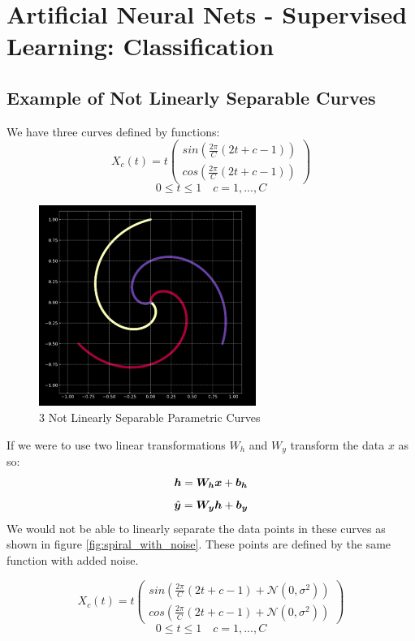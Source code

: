 \chapter{Artificial Neural Nets - Supervised Learning: Classification }

\section{Example of Not Linearly Separable Curves}

We have three curves defined by functions:
\[X_c(t) = t
\begin{pmatrix}
    sin( \frac{2 \pi}{C}(2t + c -1)) \\
    cos( \frac{2 \pi}{C}(2t + c -1))
\end{pmatrix}
 \]
\[ 0 \leq t \leq 1 \quad c = 1,..., C\]

\begin{figure}[ht]
    \centering
    \includegraphics[width=200pt]{labs/02/images/spiral1.png}
    \caption{3 Not Linearly Separable Parametric Curves}
    \label{fig:spiral}
\end{figure}
 
\newpage

If we were to use two linear transformations $ W_h$ and $ W_y$  transform the data $x$ as so:
\[\bm{h}= \bm{W_h}\bm{x}+ \bm{b_h} \]
\[\hat{\bm{y}} = \bm{W_y} \bm{h} + \bm{b_y}\]
We would not be able to  linearly separate the data points in these curves as shown in figure \ref{fig:spiral_with_noise}.  These points are defined by the same function with added noise.

\[X_c(t) = t
\begin{pmatrix}
    sin( \frac{2 \pi}{C}(2t + c -1) + \mathcal{N} (0, \sigma ^2 )) \\
    cos( \frac{2 \pi}{C}(2t + c -1) + \mathcal{N} (0, \sigma ^2 ) )
\end{pmatrix}
 \]
\[ 0 \leq t \leq 1 \quad c = 1,..., C\]

